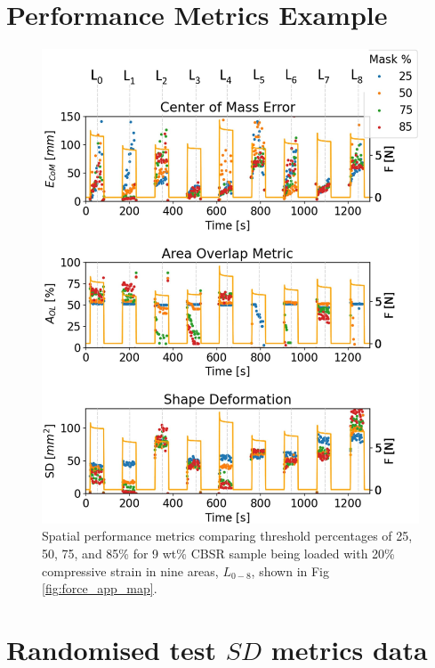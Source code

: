 \section{Performance Metrics Example}\label{apdx:Performance Metrics}
\begin{figure}[H]
	\centering
	\includegraphics[width=0.8\linewidth]{Figures/CBSR_9p_9push_20strain_60s_4_metrics_thresh_masks_v2_numbd.jpg}
	\caption{Spatial performance metrics comparing threshold percentages of 25, 50, 75, and 85\% for 9 wt\% CBSR sample being loaded with 20\% compressive strain in nine areas, $L_{0-8}$, shown in Fig \ref{fig:force_app_map}.} %
	\label{fig:recon_perform_9p}
\end{figure}

\section{Randomised test $S\!D$ metrics data}

